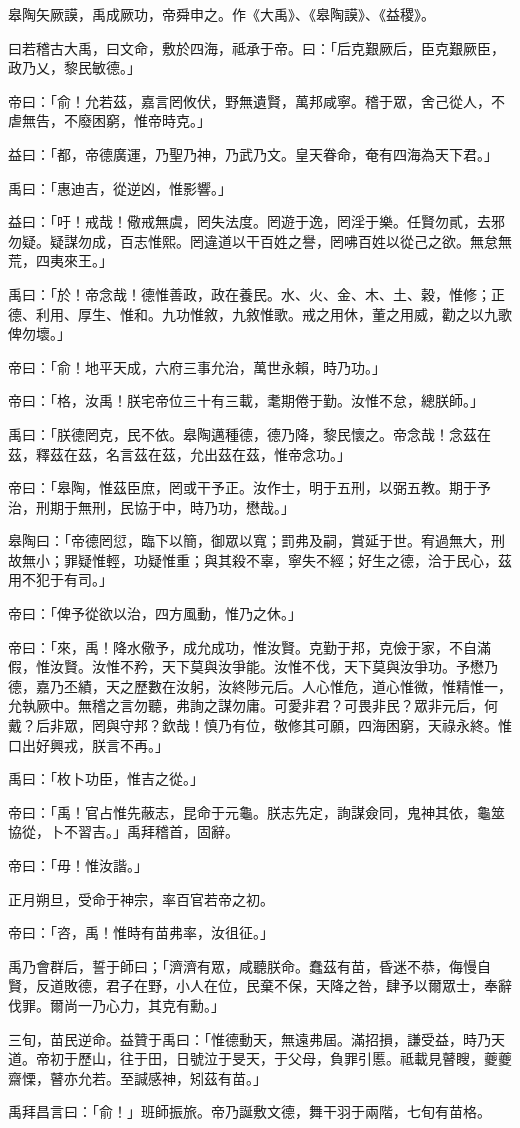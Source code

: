 
\begin{pinyinscope}
皋陶矢厥謨，禹成厥功，帝舜申之。作《大禹》、《皋陶謨》、《益稷》。

曰若稽古大禹，曰文命，敷於四海，祗承于帝。曰：「后克艱厥后，臣克艱厥臣，政乃乂，黎民敏德。」

帝曰：「俞！允若茲，嘉言罔攸伏，野無遺賢，萬邦咸寧。稽于眾，舍己從人，不虐無告，不廢困窮，惟帝時克。」

益曰：「都，帝德廣運，乃聖乃神，乃武乃文。皇天眷命，奄有四海為天下君。」

禹曰：「惠迪吉，從逆凶，惟影響。」

益曰：「吁！戒哉！儆戒無虞，罔失法度。罔遊于逸，罔淫于樂。任賢勿貳，去邪勿疑。疑謀勿成，百志惟熙。罔違道以干百姓之譽，罔咈百姓以從己之欲。無怠無荒，四夷來王。」

禹曰：「於！帝念哉！德惟善政，政在養民。水、火、金、木、土、穀，惟修；正德、利用、厚生、惟和。九功惟敘，九敘惟歌。戒之用休，董之用威，勸之以九歌俾勿壞。」

帝曰：「俞！地平天成，六府三事允治，萬世永賴，時乃功。」

帝曰：「格，汝禹！朕宅帝位三十有三載，耄期倦于勤。汝惟不怠，總朕師。」

禹曰：「朕德罔克，民不依。皋陶邁種德，德乃降，黎民懷之。帝念哉！念茲在茲，釋茲在茲，名言茲在茲，允出茲在茲，惟帝念功。」

帝曰：「皋陶，惟茲臣庶，罔或干予正。汝作士，明于五刑，以弼五教。期于予治，刑期于無刑，民協于中，時乃功，懋哉。」

皋陶曰：「帝德罔愆，臨下以簡，御眾以寬；罰弗及嗣，賞延于世。宥過無大，刑故無小；罪疑惟輕，功疑惟重；與其殺不辜，寧失不經；好生之德，洽于民心，茲用不犯于有司。」

帝曰：「俾予從欲以治，四方風動，惟乃之休。」

帝曰：「來，禹！降水儆予，成允成功，惟汝賢。克勤于邦，克儉于家，不自滿假，惟汝賢。汝惟不矜，天下莫與汝爭能。汝惟不伐，天下莫與汝爭功。予懋乃德，嘉乃丕績，天之歷數在汝躬，汝終陟元后。人心惟危，道心惟微，惟精惟一，允執厥中。無稽之言勿聽，弗詢之謀勿庸。可愛非君？可畏非民？眾非元后，何戴？后非眾，罔與守邦？欽哉！慎乃有位，敬修其可願，四海困窮，天祿永終。惟口出好興戎，朕言不再。」

禹曰：「枚卜功臣，惟吉之從。」

帝曰：「禹！官占惟先蔽志，昆命于元龜。朕志先定，詢謀僉同，鬼神其依，龜筮協從，卜不習吉。」禹拜稽首，固辭。

帝曰：「毋！惟汝諧。」

正月朔旦，受命于神宗，率百官若帝之初。

帝曰：「咨，禹！惟時有苗弗率，汝徂征。」

禹乃會群后，誓于師曰；「濟濟有眾，咸聽朕命。蠢茲有苗，昏迷不恭，侮慢自賢，反道敗德，君子在野，小人在位，民棄不保，天降之咎，肆予以爾眾士，奉辭伐罪。爾尚一乃心力，其克有勳。」

三旬，苗民逆命。益贊于禹曰：「惟德動天，無遠弗屆。滿招損，謙受益，時乃天道。帝初于歷山，往于田，日號泣于旻天，于父母，負罪引慝。祗載見瞽瞍，夔夔齋慄，瞽亦允若。至諴感神，矧茲有苗。」

禹拜昌言曰：「俞！」班師振旅。帝乃誕敷文德，舞干羽于兩階，七旬有苗格。


\end{pinyinscope}